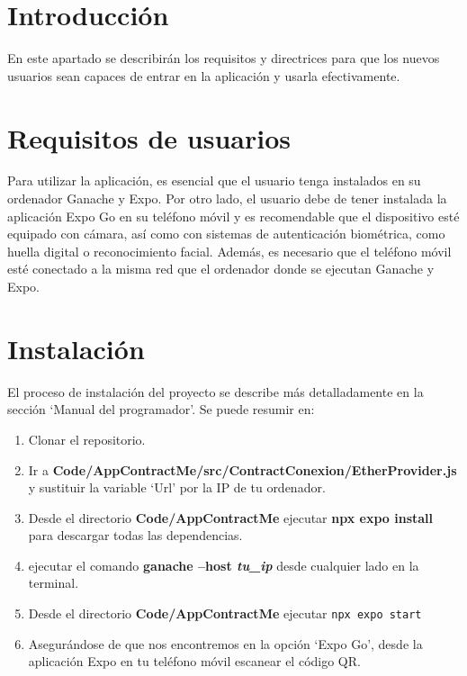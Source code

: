 
\section{Introducción}

En este apartado se describirán los requisitos y directrices para que los nuevos usuarios sean capaces de entrar en la aplicación y usarla efectivamente.

\section{Requisitos de usuarios}

Para utilizar la aplicación, es esencial que el usuario tenga instalados en su ordenador Ganache y Expo. 
Por otro lado, el usuario debe de tener instalada la aplicación Expo Go en su teléfono móvil y es recomendable que el dispositivo esté equipado con cámara, así como con sistemas de autenticación biométrica, como huella digital o reconocimiento facial. 
Además, es necesario que el teléfono móvil esté conectado a la misma red que el ordenador donde se ejecutan Ganache y Expo.

\section{Instalación}

El proceso de instalación del proyecto se describe más detalladamente en la sección `Manual del programador'.
Se puede resumir en:

\begin{enumerate}

\item Clonar el repositorio.

\item Ir a \textbf{Code/AppContractMe/src/ContractConexion/EtherProvider.js} y sustituir la variable `Url' por la IP de tu ordenador.

\item Desde el directorio \textbf{Code/AppContractMe} ejecutar \textbf{npx expo install} para descargar todas las dependencias.

\item ejecutar el comando \textbf{ganache --host \textit{tu\_ip} } desde cualquier lado en la terminal.

\item Desde el directorio \textbf{Code/AppContractMe} ejecutar \texttt{npx expo start}

\item Asegurándose de que nos encontremos en la opción `Expo Go', desde la aplicación Expo en tu teléfono móvil escanear el código QR.

\end{enumerate}

